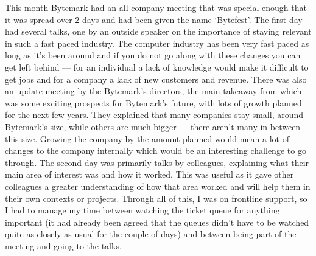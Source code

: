 \documentclass[12pt,a4paper]{article}
\newcommand{\paragraphnl}[1]{\paragraph{#1}\mbox{}\\}
\begin{document}
	This month Bytemark had an all-company meeting that was special enough that
	it was spread over 2 days and had been given the name `Bytefest'. The first
	day had several talks, one by an outside speaker on the importance of
	staying relevant in such a fast paced industry. The computer industry has
	been very fast paced as long as it's been around and if you do not go along
	with these changes you can get left behind --- for an individual a lack of
	knowledge would make it difficult to get jobs and for a company a lack of
	new customers and revenue. There was also an update meeting by the
	Bytemark's directors, the main takeaway from which was some exciting
	prospects for Bytemark's future, with lots of growth planned for the next
	few years. They explained that many companies stay small, around Bytemark's
	size, while others are much bigger --- there aren't many in between this
	size. Growing the company by the amount planned would mean a lot of changes
	to the company internally which would be an interesting challenge to go
	through. The second day was primarily talks by colleagues, explaining what
	their main area of interest was and how it worked. This was useful as it
	gave other colleagues a greater understanding of how that area worked and
	will help them in their own contexts or projects. Through all of this, I was
	on frontline support, so I had to manage my time between watching the ticket
	queue for anything important (it had already been agreed that the queues
	didn't have to be watched quite as closely as usual for the couple of days)
	and between being part of the meeting and going to the talks.


\end{document}
